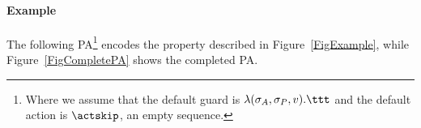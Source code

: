 
\paragraph{Example}

The following PA\footnote{Where we assume that the default guard is
\(\lambda(\sigma_A, \sigma_P, v). \ttt\) and the default action is
\(\actskip\), an empty sequence.}
encodes the property described in Figure~\ref{FigExample}, while Figure~\ref{FigCompletePA} shows the completed PA.

